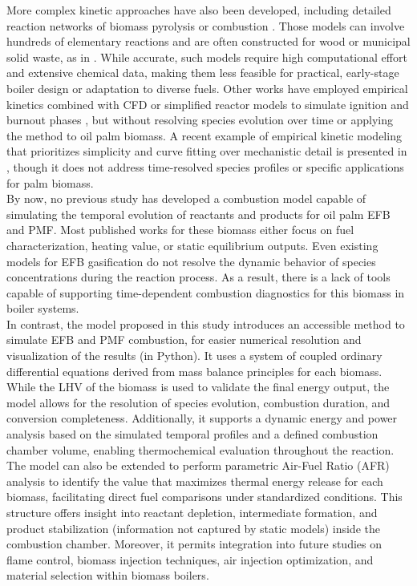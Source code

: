 \documentclass[preprint,12pt]{elsarticle}
\begin{document}
More complex kinetic approaches have also been developed, including detailed reaction networks of biomass pyrolysis or combustion \cite{Dhahak2021, Ranzi2013}. Those models can involve hundreds of elementary reactions and are often constructed for wood or municipal solid waste, as in \cite{Luo2019, Frank2014}. While accurate, such models require high computational effort and extensive chemical data, making them less feasible for practical, early-stage boiler design or adaptation to diverse fuels. Other works have employed empirical kinetics combined with CFD or simplified reactor models to simulate ignition and burnout phases \cite{Silva2023, Navarrete2017}, but without resolving species evolution over time or applying the method to oil palm biomass. A recent example of empirical kinetic modeling that prioritizes simplicity and curve fitting over mechanistic detail is presented in \cite{Varhegyi2020}, though it does not address time-resolved species profiles or specific applications for palm biomass.\\

By now, no previous study has developed a combustion model capable of simulating the temporal evolution of reactants and products for oil palm EFB and PMF. Most published works for these biomass either focus on fuel characterization, heating value, or static equilibrium outputs. Even existing models for EFB gasification \cite{OilPalmRachisGasification, Ramos2017} do not resolve the dynamic behavior of species concentrations during the reaction process. As a result, there is a lack of tools capable of supporting time-dependent combustion diagnostics for this biomass in boiler systems.\\

In contrast, the model proposed in this study introduces an accessible method to simulate EFB and PMF combustion, for easier numerical resolution and visualization of the results (in Python). It uses a system of coupled ordinary differential equations derived from mass balance principles for each biomass. While the LHV of the biomass is used to validate the final energy output, the model allows for the resolution of species evolution, combustion duration, and conversion completeness. Additionally, it supports a dynamic energy and power analysis based on the simulated temporal profiles and a defined combustion chamber volume, enabling thermochemical evaluation throughout the reaction. The model can also be extended to perform parametric Air-Fuel Ratio (AFR) analysis to identify the value that maximizes thermal energy release for each biomass, facilitating direct fuel comparisons under standardized conditions. This structure offers insight into reactant depletion, intermediate formation, and product stabilization (information not captured by static models) inside the combustion chamber. Moreover, it permits integration into future studies on flame control, biomass injection techniques, air injection optimization, and material selection within biomass boilers.\\
\end{document}
